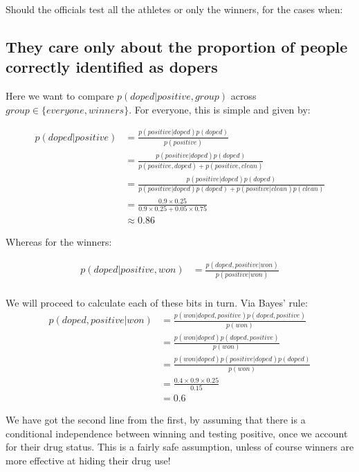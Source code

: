 \documentclass[11pt,fullpage]{book}
\begin{document}
Should the officials test all the athletes or only the winners, for the cases when:

\subsection{They care only about the proportion of people correctly identified as dopers}
Here we want to compare $p(doped|positive,group)$ across $group\in\{everyone,winners\}$. For everyone, this is simple and given by:

\begin{equation}
\begin{align}
p(doped|positive) &= \frac{p(positive|doped)p(doped)}{p(positive)}\\
&= \frac{p(positive|doped)p(doped)}{p(positive,doped) + p(positive,clean)}\\
&= \frac{p(positive|doped)p(doped)}{p(positive|doped)p(doped) + p(positive|clean)p(clean)}\\
&= \frac{0.9\times 0.25}{0.9\times 0.25 + 0.05\times 0.75}\\
&\approx 0.86
\end{align}
\end{equation}

Whereas for the winners:

\begin{equation}
\begin{align}
p(doped|positive,won) &= \frac{p(doped,positive|won)}{p(positive|won)}\\
\end{align}
\end{equation}

We will proceed to calculate each of these bits in turn. Via Bayes' rule:
\begin{equation}
\begin{align}
p(doped,positive|won) &= \frac{p(won|doped,positive)p(doped,positive)}{p(won)}\\
&= \frac{p(won|doped)p(doped,positive)}{p(won)}\\
&= \frac{p(won|doped)p(positive|doped)p(doped)}{p(won)}\\
&= \frac{0.4 \times 0.9 \times 0.25}{0.15}\\
&= 0.6
\end{align}
\end{equation}

We have got the second line from the first, by assuming that there is a conditional independence between winning and testing positive, once we account for their drug status. This is a fairly safe assumption, unless of course winners are more effective at hiding their drug use!
\end{document}
